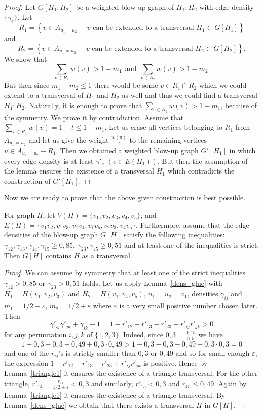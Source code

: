 \documentclass[12pt,a4paper]{amsart}
\numberwithin{equation}{section}
\begin{document}
\begin{proof} Let $G[H_1:H_2]$ be a weighted blow-up graph of $H_1:H_2$ with
  edge density $\{\gamma_e\}$. Let
$$R_1=\left\{ v\in A_{u_1=u_2}\ |\  \mbox{ $v$ can be extended to a
    transversal  $H_1\subset G[H_1]$}\right\} $$
and 
$$R_2=\left\{ v\in A_{u_1=u_2}\ |\  \mbox{ $v$ can be extended to a
    transversal  $H_2\subset G[H_2]$}\right\} .$$
We show that
$$\sum_{v\in R_1}w(v)> 1-m_1\ \ \mbox{and}\ \ \sum_{v\in R_2}w(v)> 1-m_2.$$
But then since $m_1+m_2\leq 1$ there would be some $v\in R_1\cap R_2$ which we
could extend to a transversal of $H_1$ and $H_2$ as well and thus we could find
a transversal $H_1:H_2$.
Naturally, it is enough to prove that $\sum_{v\in R_1}w(v)> 1-m_1$, because
of the symmetry. We prove it by contradiction. Assume that  $\sum_{v\in
  R_1}w(v)=1-t\leq 1-m_1$. Let us erase all vertices belonging to $R_1$ from
$A_{u_1=u_2}$ and let us give the weight $\frac{w(u)}{t}$ to the remaining
vertices $u\in A_{u_1=u_2}-R_1$. Then we obtained a weighted blow-up graph
$G'[H_1]$ in which every edge density is at least $\gamma'_e$ $(e\in E(H_1))$.
But then the assumption of the lemma ensures the existence of a transversal
$H_1$ which contradicts the construction of $G'[H_1]$. 
\end{proof} 

Now we are ready to prove that the above given construction is best possible.

\begin{counte} \label{bow-tie1}
 For graph $H$, let $V(H)=\{v_1,v_2,v_3,v_4,v_5\}$, and
$E(H)=\{v_1v_2,v_1v_3,v_1v_4,v_1v_5,v_2v_3,v_4v_5\}$. Furthermore, assume that 
 the edge densities of the blow-up graph $G[H]$ satisfy the following
inequalities: $\gamma_{12},\gamma_{13},\gamma_{14},\gamma_{15}\geq 0,85$,
$\gamma_{23},\gamma_{45}\geq 0,51$ and at least one of the inequalities is
strict. Then $G[H]$ contains $H$ as a transversal.
\end{counte} 

\begin{proof} We can assume by symmetry that at least one of the strict
  inequalities 
  $\gamma_{12}> 0,85$ or $\gamma_{23}>0,51$ holds. Let us apply 
  Lemma~\ref{dens_glue} with 
$H_1=H(v_1,v_2,v_3)$ and $H_2=H(v_1,v_4,v_5)$, $u_1=u_2=v_1$, densities
$\gamma_{ij}$ and $m_1=1/2-\varepsilon$, $m_2=1/2+\varepsilon$ where
$\varepsilon$ is a very small positive number chosen later.
Then 
$$\gamma'_{ij}\gamma'_{jk}+\gamma_{ik}-1=1-r'_{12}-r'_{13}-r'_{23}+r'_{ij}r'_{jk}>0$$ 
for any permutation $i,j,k$ of  $\{1,2,3\}$. Indeed, since
$0,3=\frac{0,15}{0,5}$ we have
$$1-0,3-0,3-0,49+0,3\cdot 0,49>1-0,3-0,3-0,49+0,3\cdot 0,3=0$$
and one of the $r_{ij}$'s is strictly smaller than $0,3$ or $0,49$ and so for
small enough $\varepsilon$, the expression
$1-r'_{12}-r'_{13}-r'_{23}+r'_{ij}r'_{jk}$ is positive. Hence by
Lemma~\ref{triangle1} it ensures the existence of a triangle transversal.
For the other triangle, $r'_{14}=\frac{r_{14}}{1/2+\varepsilon}<0,3$ and
similarly, $r'_{15}<0,3$ and $r_{45}\leq 0,49$. Again by Lemma~\ref{triangle1}
it ensures the existence of a triangle transversal. By Lemma~\ref{dens_glue}
we obtain that there exists a transversal $H$ in $G[H]$.
\end{proof}
\end{document}
